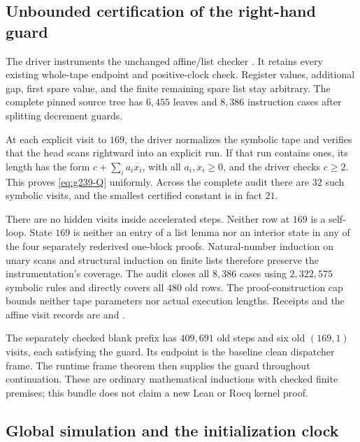 \subsection{Unbounded certification of the right-hand guard}

The driver  instruments the
unchanged affine/list checker .
It retains every existing whole-tape endpoint and positive-clock
check.  Register values, additional gap, first spare value, and the
finite remaining spare list stay arbitrary.  The complete pinned
source tree has $6{,}455$ leaves and $8{,}386$ instruction cases after
splitting decrement guards.

At each explicit visit to $169$, the driver normalizes the symbolic
tape and verifies that the head scans rightward into an explicit
run.  If that run contains ones, its length has the form
$c+\sum_i a_i x_i$, with all $a_i,x_i\ge0$, and the driver checks
$c\ge2$.  This proves \eqref{eq:g239-Q} uniformly.  Across the complete
audit there are $32$ such symbolic visits, and the smallest certified
constant is in fact $21$.

There are no hidden visits inside accelerated steps.  Neither row at
$169$ is a self-loop.  State $169$ is neither an entry of a list
lemma nor an interior state in any of the four separately rederived
one-block proofs.  Natural-number induction on unary scans and
structural induction on finite lists therefore preserve the
instrumentation's coverage.  The audit closes all $8{,}386$ cases
using $2{,}322{,}575$ symbolic rules and directly covers all $480$ old
rows.  The proof-construction cap bounds neither tape parameters nor
actual execution lengths.  Receipts and the affine visit records are
 and
.

The separately checked blank prefix has $409{,}691$ old steps and
six old $(169,1)$ visits, each satisfying the guard.  Its endpoint
is the baseline clean dispatcher frame.  The runtime frame theorem
then supplies the guard throughout continuation.  These are ordinary
mathematical inductions with checked finite premises; this bundle
does not claim a new Lean or Rocq kernel proof.

\subsection{Global simulation and the initialization clock}

